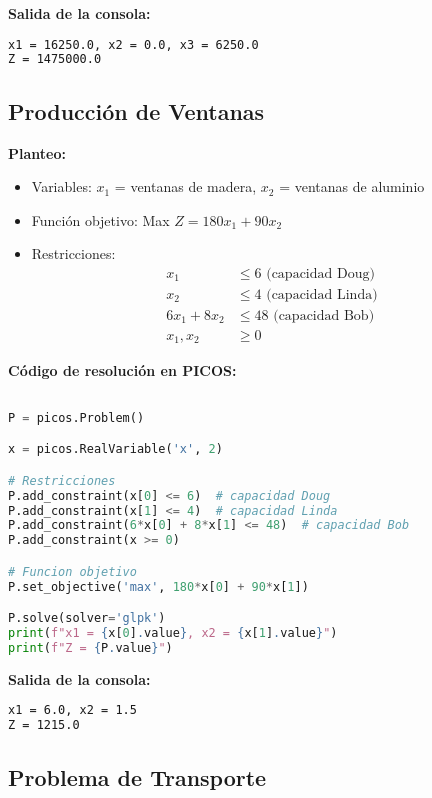 \documentclass[12pt]{article}
\begin{document}
\textbf{Salida de la consola:}
\begin{lstlisting}[language=bash,backgroundcolor=\color{black},basicstyle=\color{white}\ttfamily,numbers=none]
x1 = 16250.0, x2 = 0.0, x3 = 6250.0
Z = 1475000.0
\end{lstlisting}

\subsection{Producción de Ventanas}

\textbf{Planteo:}
\begin{itemize}
\item Variables: $x_1$ = ventanas de madera, $x_2$ = ventanas de aluminio
\item Función objetivo: Max $Z = 180x_1 + 90x_2$
\item Restricciones:
  \begin{align*}
  x_1 &\leq 6 \text{ (capacidad Doug)} \\
  x_2 &\leq 4 \text{ (capacidad Linda)} \\
  6x_1 + 8x_2 &\leq 48 \text{ (capacidad Bob)} \\
  x_1, x_2 &\geq 0
  \end{align*}
\end{itemize}

\textbf{Código de resolución en PICOS:}
\begin{lstlisting}[language=Python]

P = picos.Problem()

x = picos.RealVariable('x', 2)

# Restricciones
P.add_constraint(x[0] <= 6)  # capacidad Doug
P.add_constraint(x[1] <= 4)  # capacidad Linda
P.add_constraint(6*x[0] + 8*x[1] <= 48)  # capacidad Bob
P.add_constraint(x >= 0)

# Funcion objetivo
P.set_objective('max', 180*x[0] + 90*x[1])

P.solve(solver='glpk')
print(f"x1 = {x[0].value}, x2 = {x[1].value}")
print(f"Z = {P.value}")
\end{lstlisting}

\textbf{Salida de la consola:}
\begin{lstlisting}[language=bash,backgroundcolor=\color{black},basicstyle=\color{white}\ttfamily,numbers=none]
x1 = 6.0, x2 = 1.5
Z = 1215.0
\end{lstlisting}

\subsection{Problema de Transporte}
\end{document}
